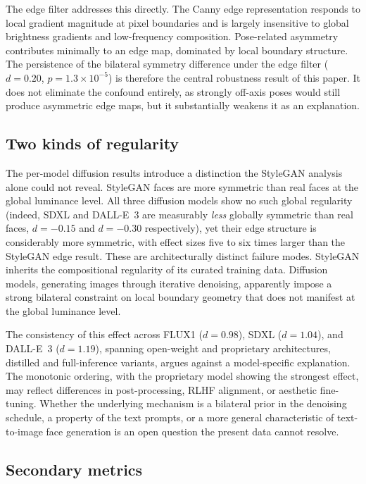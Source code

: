 \documentclass[11pt,a4paper]{article}
\begin{document}
The edge filter addresses this directly. The Canny edge representation responds
to local gradient magnitude at pixel boundaries and is largely insensitive to
global brightness gradients and low-frequency composition. Pose-related
asymmetry contributes minimally to an edge map, dominated by local boundary
structure. The persistence of the bilateral symmetry difference under the edge
filter ($d = 0.20$, $p = 1.3 \times 10^{-5}$) is therefore the central
robustness result of this paper. It does not eliminate the confound entirely, as
strongly off-axis poses would still produce asymmetric edge maps, but it
substantially weakens it as an explanation.

\subsection{Two kinds of regularity}

The per-model diffusion results introduce a distinction the StyleGAN analysis
alone could not reveal. StyleGAN faces are more symmetric than real faces at the
global luminance level. All three diffusion models show no such global
regularity (indeed, SDXL and DALL-E~3 are measurably \emph{less} globally
symmetric than real faces, $d = -0.15$ and $d = -0.30$ respectively), yet their
edge structure is considerably more symmetric, with effect sizes five to six
times larger than the StyleGAN edge result. These are architecturally distinct
failure modes. StyleGAN inherits the compositional regularity of its curated
training data. Diffusion models, generating images through iterative denoising,
apparently impose a strong bilateral constraint on local boundary geometry that
does not manifest at the global luminance level.

The consistency of this effect across FLUX1 ($d = 0.98$), SDXL ($d = 1.04$),
and DALL-E~3 ($d = 1.19$), spanning open-weight and proprietary architectures,
distilled and full-inference variants, argues against a model-specific
explanation. The monotonic ordering, with the proprietary model showing the
strongest effect, may reflect differences in post-processing, RLHF alignment,
or aesthetic fine-tuning. Whether the underlying mechanism is a bilateral prior
in the denoising schedule, a property of the text prompts, or a more general
characteristic of text-to-image face generation is an open question the present
data cannot resolve.

\subsection{Secondary metrics}
\end{document}
